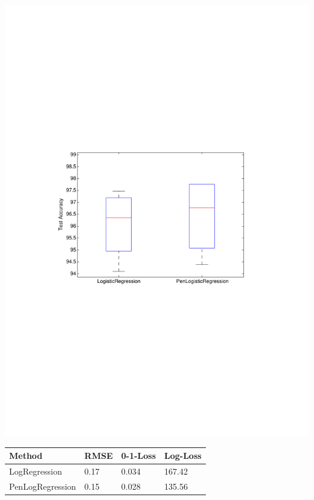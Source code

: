 \begin{minipage}{\textwidth}
  \begin{minipage}[b]{0.38\textwidth}
    \centering
    \includegraphics[clip, trim=4cm 10.5cm 3.5cm 10cm, width=\textwidth]{figures/comparison_LR_pLR.pdf}
    \label{fig:comp_LR_pLR}
  \end{minipage}
  \hfill
  \begin{minipage}[b]{0.6\textwidth}
    \centering
        \begin{tabular}{ | l | l | l | p{1.2cm} |}
    \hline
    Method & RMSE & 0-1-Loss & Log-Loss \\ \hline
    LogRegression & 0.17 & 0.034 & 167.42 \\ \hline
    PenLogRegression & 0.15 & 0.028 & 135.56 \\ \hline
    \end{tabular}
      \label{table:test_errors}
      \par\vspace{60pt}
    \end{minipage}
  \end{minipage}
 
